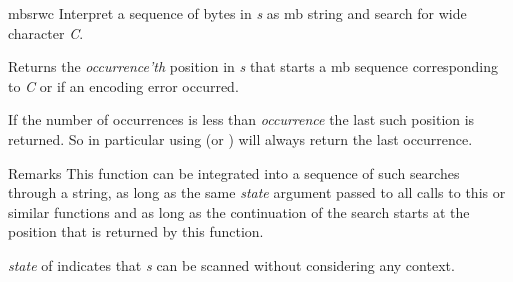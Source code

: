 \begin{DoxyDocu}{mbsrwc}
\label{mbstrings_8h_a09325a662335595a353a0a54d985304b_a09325a662335595a353a0a54d985304b}
Interpret a sequence of bytes in {\itshape s} as mb string and search for wide character {\itshape C}.

\begin{DoxyReturn}{Returns}
the {\itshape occurrence'th} position in {\itshape s} that starts a mb sequence corresponding to {\itshape C} or  if an encoding error occurred.
\end{DoxyReturn}
If the number of occurrences is less than {\itshape occurrence} the last such position is returned. So in particular using  (or ) will always return the last occurrence.

\begin{DoxyRemark}{Remarks}
This function can be integrated into a sequence of such searches through a string, as long as the same {\itshape state} argument passed to all calls to this or similar functions and as long as the continuation of the search starts at the position that is returned by this function.

{\itshape state} of  indicates that {\itshape s} can be scanned without considering any context.
\end{DoxyRemark}


\end{DoxyDocu}
